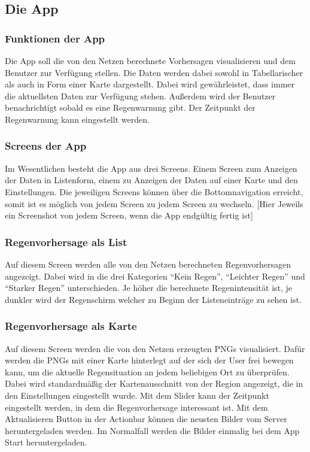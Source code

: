 \subsection{Die App}\label{die app}

\subsubsection{Funktionen der App}\label{funkionen der app}
Die App soll die von den Netzen berechnete Vorhersagen visualisieren und dem Benutzer zur Verfügung stellen. Die Daten werden dabei sowohl in Tabellarischer als auch in Form einer Karte dargestellt. Dabei wird gewährleistet, dass immer die aktuellsten Daten zur Verfügung stehen. Außerdem wird der Benutzer benachrichtigt sobald es eine Regenwarnung gibt. Der Zeitpunkt der Regenwarnung kann eingestellt werden.

\subsubsection{Screens der App}\label{screens der app}
Im Wesentlichen besteht die App aus drei Screens. Einem Screen zum Anzeigen der Daten in Listenform, einem zu Anzeigen der Daten auf einer Karte und den Einstellungen. Die jeweiligen Screens können über die Bottomnavigation erreicht, somit ist es möglich von jedem Screen zu jedem Screen zu wechseln.   
[Hier Jeweils ein Screenshot von jedem Screen, wenn die App endgültig fertig ist]  

\subsubsection*{Regenvorhersage als List}
Auf diesem Screen werden alle von den Netzen berechneten Regenvorhersagen angezeigt. Dabei wird in die drei Kategorien “Kein Regen”, “Leichter Regen” und “Starker Regen” unterschieden. Je höher die berechnete Regenintensität ist, je dunkler wird der Regenschirm welcher zu Beginn der Listeneinträge zu sehen ist.   

\subsubsection*{Regenvorhersage als Karte}
Auf diesem Screen werden die von den Netzen erzeugten PNGs visualisiert. Dafür werden die PNGs mit einer Karte hinterlegt auf der sich der User frei bewegen kann, um die aktuelle Regensituation an jedem beliebigen Ort zu überprüfen. Dabei wird standardmäßig der Kartenausschnitt von der Region angezeigt, die in den Einstellungen eingestellt wurde. Mit dem Slider kann der Zeitpunkt eingestellt werden, in dem die Regenvorhersage interessant ist. Mit dem Aktualisieren Button in der Actionbar können die neusten Bilder vom Server heruntergeladen werden. Im Normalfall werden die Bilder einmalig bei dem App Start heruntergeladen.  

